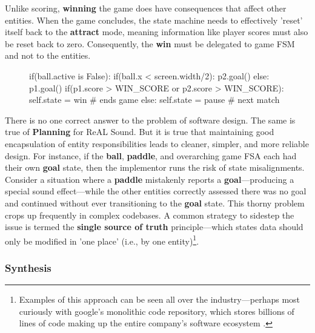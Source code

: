\documentclass{report}
\newcommand{\rs}{ReAL Sound\xspace}
\newcommand{\plan}{\textbf{Planning}\xspace}
\newcommand{\state}[1]{\textbf{#1}}
\newcommand{\pad}{\textbf{paddle}\xspace}
\newcommand{\ball}{\textbf{ball}\xspace}
\newcommand{\tech}[1]{\textbf{#1}}
\begin{document}
Unlike scoring, \state{winning} the game does have consequences that affect other entities. When the game concludes, the state machine needs to effectively 'reset' itself back to the \state{attract} mode, meaning information like player scores must also be reset back to zero. Consequently, the \state{win} must be delegated to game FSM and not to the entities.   

\begin{figure}[h]

\begin{codeblock}
if(ball.active is False):
    if(ball.x < screen.width/2):
        p2.goal()
    else:
        p1.goal()
    if(p1.score > WIN_SCORE or p2.score > WIN_SCORE):
        self.state = win # ends game
    else: 
        self.state = pause # next match
\end{codeblock}
    
    \captionof{code}{\state{Goal} and \state{Win} logic}
    \label{code:goal_win_ex}
\end{figure}


There is no one correct answer to the problem of software design. The same is true of \plan for \rs. But it is true that maintaining good encapsulation of entity responsibilities leads to cleaner, simpler, and more reliable design. For instance, if the \ball, \pad, and overarching game FSA each had their own \state{goal} state, then the implementor runs the risk of state misalignments. Consider a situation where a \pad mistakenly reports a \state{goal}---producing a special sound effect---while the other entities correctly assessed there was no goal and continued without ever transitioning to the \state{goal} state. This thorny problem crops up frequently in complex codebases. A common strategy to sidestep the issue is termed the \tech{single source of truth} principle---which states data should only be modified in 'one place' (i.e., by one entity)\footnote{Examples of this approach can be seen all over the industry---perhaps most curiously with google's monolithic code repository, which stores billions of lines of code making up the entire company's software ecosystem \cite{googleRepo}.}.

\subsubsection{Synthesis}
\end{document}
